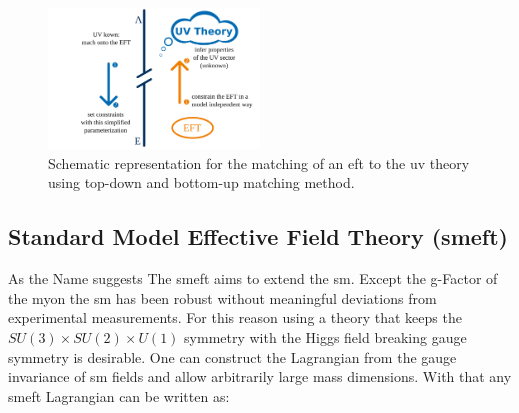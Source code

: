 \documentclass[../Bachelorarbeit.tex]{subfiles}
\begin{document}
%
\begin{figure}
    \centering
    \includegraphics[width=0.5\textwidth]{images/EFT_matching.png}
    \caption{Schematic representation for the matching of an \acrshort{eft} to the \acrshort{uv} theory using top-down and bottom-up matching method. \cite{Brivio.}}
    \label{fig:matching}
\end{figure}

\subsection{Standard Model Effective Field Theory (\acrshort{smeft})}
As the Name suggests The \acrfull{smeft}\cite{Pich.1998} aims to extend the \acrshort{sm}.
Except the g-Factor of the myon the \acrshort{sm} has been robust without meaningful deviations from experimental measurements.
For this reason using a theory that keeps the $SU(3) \times SU(2) \times U(1)$ symmetry with the Higgs field breaking gauge symmetry is desirable.
One can construct the Lagrangian from the gauge invariance of \acrshort{sm} fields and allow arbitrarily large mass dimensions.
With that any \acrshort{smeft} Lagrangian can be written as:
\end{document}
